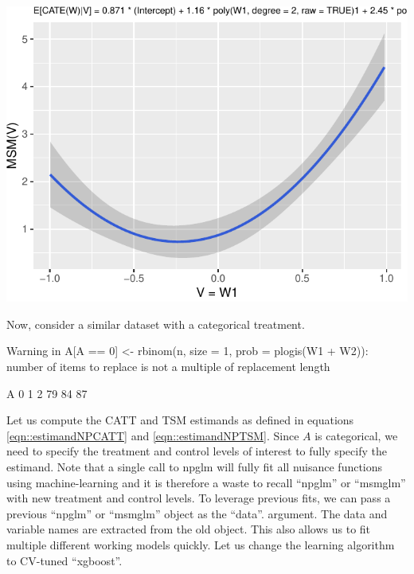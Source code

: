 \documentclass[
]{jss}
\begin{document}
\begin{CodeChunk}
\begin{center}\includegraphics{causalglm_files/figure-latex/unnamed-chunk-4-1} \end{center}

\end{CodeChunk}

Now, consider a similar dataset with a categorical treatment.

\begin{CodeChunk}
\begin{CodeOutput}
Warning in A[A == 0] <- rbinom(n, size = 1, prob = plogis(W1 + W2)): number of
items to replace is not a multiple of replacement length
\end{CodeOutput}
\begin{CodeOutput}
A
 0  1  2 
79 84 87 
\end{CodeOutput}
\end{CodeChunk}

Let us compute the CATT and TSM estimands as defined in equations
\ref{eqn::estimandNPCATT} and \ref{eqn::estimandNPTSM}. Since \(A\) is
categorical, we need to specify the treatment and control levels of
interest to fully specify the estimand. Note that a single call to npglm
will fully fit all nuisance functions using machine-learning and it is
therefore a waste to recall ``npglm'' or ``msmglm'' with new treatment
and control levels. To leverage previous fits, we can pass a previous
``npglm'' or ``msmglm'' object as the ``data''. argument. The data and
variable names are extracted from the old object. This also allows us to
fit multiple different working models quickly. Let us change the
learning algorithm to CV-tuned ``xgboost''.
\end{document}
